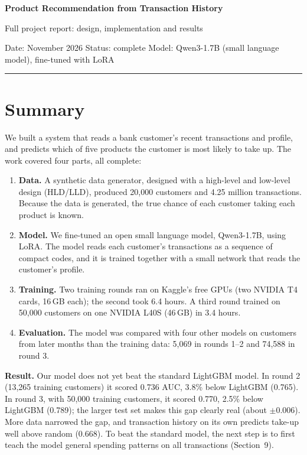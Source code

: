 \documentclass[10pt,a4paper]{article}
\begin{document}
{\bfseries\LARGE Product Recommendation from Transaction History}\par
\vspace{2pt}
{\large Full project report: design, implementation and results}\par
\vspace{4pt}
Date: November 2026 \quad\textbar\quad Status: complete \quad\textbar\quad Model: Qwen3-1.7B (small language model), fine-tuned with LoRA
\vspace{6pt}
\hrule

\section*{Summary}
We built a system that reads a bank customer's recent transactions and profile, and predicts which of five products the customer is most likely to take up. The work covered four parts, all complete:
\begin{enumerate}
\item \textbf{Data.} A synthetic data generator, designed with a high-level and low-level design (HLD/LLD), produced 20,000 customers and 4.25 million transactions. Because the data is generated, the true chance of each customer taking each product is known.
\item \textbf{Model.} We fine-tuned an open small language model, Qwen3-1.7B, using LoRA. The model reads each customer's transactions as a sequence of compact codes, and it is trained together with a small network that reads the customer's profile.
\item \textbf{Training.} Two training rounds ran on Kaggle's free GPUs (two NVIDIA T4 cards, 16\,GB each); the second took 6.4 hours. A third round trained on 50,000 customers on one NVIDIA L40S (46\,GB) in 3.4 hours.
\item \textbf{Evaluation.} The model was compared with four other models on customers from later months than the training data: 5,069 in rounds 1--2 and 74,588 in round 3.
\end{enumerate}
\textbf{Result.} Our model does not yet beat the standard LightGBM model. In round 2 (13,265 training customers) it scored 0.736 AUC, 3.8\% below LightGBM (0.765). In round 3, with 50,000 training customers, it scored 0.770, 2.5\% below LightGBM (0.789); the larger test set makes this gap clearly real (about $\pm$0.006). More data narrowed the gap, and transaction history on its own predicts take-up well above random (0.668). To beat the standard model, the next step is to first teach the model general spending patterns on all transactions (Section~9).
\end{document}
